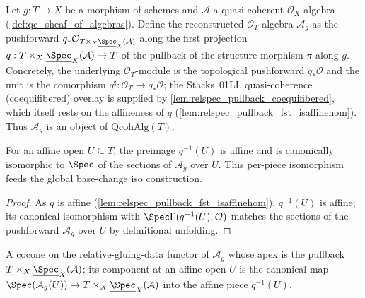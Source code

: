 \begin{definition}
  \label{def:relspec_qcoh_pullback}
  Let \(g : T \to X\) be a morphism of schemes and \(\mathcal{A}\) a quasi-coherent
  \(\mathcal{O}_X\)-algebra (\cref{def:qc_sheaf_of_algebras}). Define the reconstructed
  \(\mathcal{O}_T\)-algebra \(\mathcal{A}_g\) as the pushforward
  \(q_* \mathcal{O}_{T \times_X \underline{\Spec}_X(\mathcal{A})}\) along the first
  projection \(q : T \times_X \underline{\Spec}_X(\mathcal{A}) \to T\) of the pullback of
  the structure morphism \(\pi\) along \(g\). Concretely, the underlying
  \(\mathcal{O}_T\)-module is the topological pushforward \(q_* \mathcal{O}\) and the unit
  is the comorphism \(q^\sharp : \mathcal{O}_T \to q_* \mathcal{O}\); the Stacks~01LL
  quasi-coherence (coequifibered) overlay is supplied by
  \cref{lem:relspec_pullback_coequifibered}, which itself rests on the affineness of \(q\)
  (\cref{lem:relspec_pullback_fst_isaffinehom}). Thus \(\mathcal{A}_g\) is an object of
  \(\mathrm{QcohAlg}(T)\).
\end{definition}

\begin{definition}
  \label{def:relspec_pullback_iso_affine_piece}
  For an affine open \(U \subseteq T\), the preimage \(q^{-1}(U)\) is affine and is
  canonically isomorphic to \(\Spec\) of the sections of \(\mathcal{A}_g\) over \(U\).
  This per-piece isomorphism feeds the global base-change
  iso construction.
\end{definition}

\begin{proof}
  As \(q\) is affine (\cref{lem:relspec_pullback_fst_isaffinehom}), \(q^{-1}(U)\) is
  affine; its canonical isomorphism with \(\Spec \Gamma(q^{-1}(U), \mathcal{O})\) matches
  the sections of the pushforward \(\mathcal{A}_g\) over \(U\) by definitional
  unfolding.
\end{proof}

\begin{definition}
  \label{def:relspec_pullback_cocone}
  A cocone on the relative-gluing-data functor of \(\mathcal{A}_g\) whose apex is the
  pullback \(T \times_X \underline{\Spec}_X(\mathcal{A})\); its component at an affine
  open \(U\) is the canonical map \(\Spec(\mathcal{A}_g(U)) \to
  T \times_X \underline{\Spec}_X(\mathcal{A})\) into the affine piece \(q^{-1}(U)\).
\end{definition}


